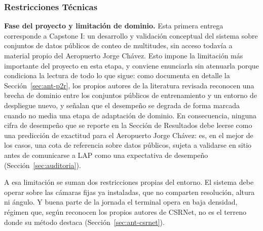 \subsubsection{Restricciones Técnicas}

\textbf{Fase del proyecto y limitación de dominio.} Esta primera entrega
corresponde a Capstone I: un desarrollo y validación conceptual del
sistema sobre conjuntos de datos públicos de conteo de multitudes, sin
acceso todavía a material propio del Aeropuerto Jorge Chávez. Esto impone
la limitación más importante del proyecto en esta etapa, y conviene
enunciarla sin atenuarla porque condiciona la lectura de todo lo que
sigue: como documenta en detalle la Sección~\ref{sec:ant-p2r}, los propios
autores de la literatura revisada reconocen una brecha de dominio entre
los conjuntos públicos de entrenamiento y un entorno de despliegue nuevo,
y señalan que el desempeño se degrada de forma marcada cuando no media una
etapa de adaptación de dominio. En consecuencia, ninguna cifra de
desempeño que se reporte en la Sección de Resultados debe leerse como una
predicción de exactitud para el Aeropuerto Jorge Chávez: es, en el mejor
de los casos, una cota de referencia sobre datos públicos, sujeta a
validarse en sitio antes de comunicarse a LAP como una expectativa de
desempeño (Sección~\ref{sec:auditoria}).

A esa limitación se suman dos restricciones propias del entorno. El
sistema debe operar sobre las cámaras fijas ya instaladas, que no
comparten resolución, altura ni ángulo. Y buena parte de la jornada el
terminal opera en baja densidad, régimen que, según reconocen los propios
autores de CSRNet, no es el terreno donde su método destaca
(Sección~\ref{sec:ant-csrnet}).
